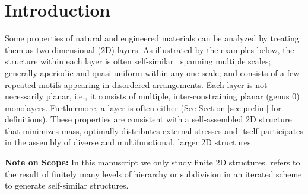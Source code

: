 \section{Introduction}
\label{sec:intro}

Some properties of natural and engineered materials can be analyzed by treating them as two dimensional (2D) layers. As illustrated by the examples below, the structure within each layer is often self-similar~\cite{2012arXiv1204.6389G} spanning multiple scales; generally aperiodic and quasi-uniform within any one scale; and consists of a few repeated motifs appearing in disordered arrangements. Each layer is not necessarily planar, i.e., it consists of multiple, inter-constraining planar (genus 0) monolayers. Furthermore, a layer is often  either  (See Section \ref{sec:prelim} for definitions). These properties are consistent with a self-assembled 2D structure that minimizes mass, optimally distributes external stresses and itself participates in the assembly of diverse and multifunctional, larger 2D structures.

\noindent
\textbf{Note on Scope:} In this manuscript we only study finite 2D structures.  refers to the result of finitely many levels of hierarchy or subdivision in an iterated scheme to generate self-similar structures.




\ClearMyMinHeight
{}

